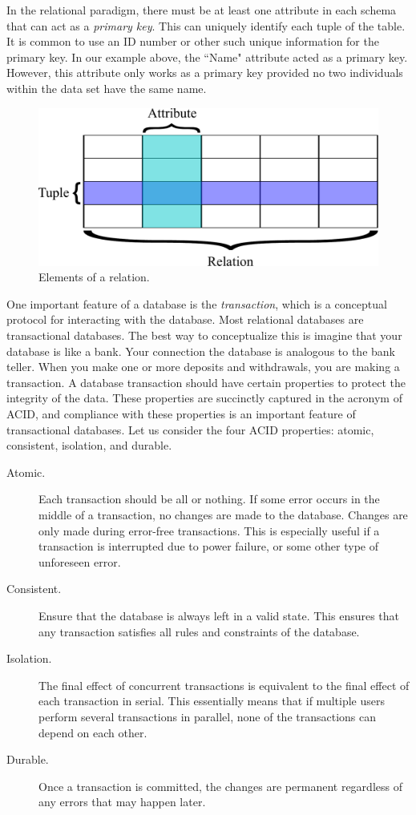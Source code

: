 In the relational paradigm, there must be at least one attribute in each schema that can act as a \emph{primary key}.
This can uniquely identify each tuple of the table.
It is common to use an ID number or other such unique information for the primary key.
In our example above, the ``Name" attribute acted as a primary key. However, this attribute only works as a primary
key provided no two individuals within the data set have the same name.
\begin{figure}
\centering
\includegraphics[width=\textwidth]{rdb_table.pdf}
\caption{Elements of a relation.}
\label{fig:relation}
\end{figure}

One important feature of a database is the \emph{transaction}, which is a conceptual protocol for
interacting with the database.
Most relational databases are transactional databases.
The best way to conceptualize this is imagine that your database is like a bank.
Your connection the database is analogous to the bank teller.
When you make one or more deposits and withdrawals, you are making a transaction.
A database transaction should have certain properties to protect the integrity of the data.
These properties are succinctly captured in the acronym of ACID, and
compliance with these properties is an important feature of transactional databases.
Let us consider the four ACID properties: atomic, consistent, isolation, and durable.
\begin{description}
\item[Atomic.] Each transaction should be all or nothing.  If some error occurs in the middle of a transaction,
no changes are made to the database.  Changes are only made during error-free transactions.  This is especially
useful if a transaction is interrupted due to power failure, or some other type of unforeseen error.
\item[Consistent.] Ensure that the database is always left in a valid state.  This ensures that any transaction
satisfies all rules and constraints of the database.
\item[Isolation.] The final effect of concurrent transactions is equivalent to the final effect of each transaction
in serial.  This essentially means that if multiple users perform several transactions in parallel, none of the transactions
can depend on each other.
\item[Durable.] Once a transaction is committed, the changes are permanent regardless of any errors that may happen later.
\end{description}

